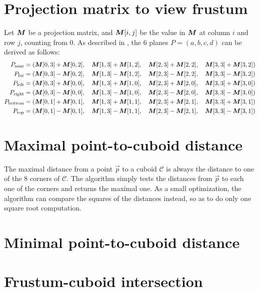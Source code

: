 \documentclass[a4paper,10pt,abstracton,notitlepage]{scrreprt}
\begin{document}
\section{Projection matrix to view frustum} \label{frustum_planes}
Let $\matrixsym{M}$ be a projection matrix, and $\matrixsym{M}[i, j]$ be the value in $\matrixsym{M}$ at column $i$ and row $j$, counting from 0.
As described in \cite{Gri2001}, the 6 planes $P = (a, b, c, d)$ can be derived as follows:
\begin{align*}
	P_{\text{near}}   = (\matrixsym{M}[0, 3] + \matrixsym{M}[0, 2], \quad \matrixsym{M}[1, 3] + \matrixsym{M}[1, 2], \quad \matrixsym{M}[2, 3] + \matrixsym{M}[2, 2], \quad \matrixsym{M}[3, 3] + \matrixsym{M}[3, 2]) \\
	P_{\text{far}}    = (\matrixsym{M}[0, 3] - \matrixsym{M}[0, 2], \quad \matrixsym{M}[1, 3] - \matrixsym{M}[1, 2], \quad \matrixsym{M}[2, 3] - \matrixsym{M}[2, 2], \quad \matrixsym{M}[3, 3] - \matrixsym{M}[3, 2]) \\
	P_{\text{left}}   = (\matrixsym{M}[0, 3] + \matrixsym{M}[0, 0], \quad \matrixsym{M}[1, 3] + \matrixsym{M}[1, 0], \quad \matrixsym{M}[2, 3] + \matrixsym{M}[2, 0], \quad \matrixsym{M}[3, 3] + \matrixsym{M}[3, 0]) \\
	P_{\text{right}}  = (\matrixsym{M}[0, 3] - \matrixsym{M}[0, 0], \quad \matrixsym{M}[1, 3] - \matrixsym{M}[1, 0], \quad \matrixsym{M}[2, 3] - \matrixsym{M}[2, 0], \quad \matrixsym{M}[3, 3] - \matrixsym{M}[3, 0]) \\
	P_{\text{bottom}} = (\matrixsym{M}[0, 1] + \matrixsym{M}[0, 1], \quad \matrixsym{M}[1, 3] + \matrixsym{M}[1, 1], \quad \matrixsym{M}[2, 3] + \matrixsym{M}[2, 1], \quad \matrixsym{M}[3, 3] + \matrixsym{M}[3, 1]) \\
	P_{\text{top}}    = (\matrixsym{M}[0, 1] - \matrixsym{M}[0, 1], \quad \matrixsym{M}[1, 3] - \matrixsym{M}[1, 1], \quad \matrixsym{M}[2, 3] - \matrixsym{M}[2, 1], \quad \matrixsym{M}[3, 3] - \matrixsym{M}[3, 1])
\end{align*}

\section{Maximal point-to-cuboid distance}
The maximal distance from a point $\overrightarrow{p}$ to a cuboid $\mathcal{C}$ is always the distance to one of the 8 corners of $\mathcal{C}$. The algorithm simply tests the distances from $\overrightarrow{p}$ to each one of the corners and returns the maximal one. As a small optimization, the algorithm can compare the squares of the distances instead, so as to do only one square root computation.

\section{Minimal point-to-cuboid distance}

\section{Frustum-cuboid intersection}



\end{document}
